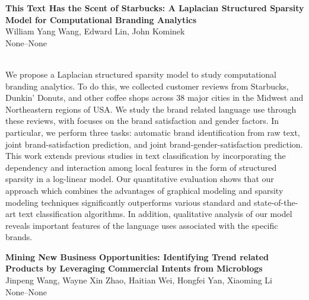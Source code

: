 \documentclass[twoside,makeidx]{book}
\renewcommand{\normalsize}{\fontsize{8}{9}\selectfont}
\renewcommand{\small}{\fontsize{7}{8}\selectfont}
\begin{document}
\par\vspace{2em}\noindent%
\begin{minipage}{\linewidth}%
\begin{center}
\textbf{\normalsize This Text Has the Scent of Starbucks: A Laplacian Structured Sparsity Model for Computational Branding Analytics}\\
\normalsize  William Yang Wang,  Edward Lin,  John Kominek\\
{\small None--None}\\
\end{center}
\end{minipage}\\[0.5em]
\nopagebreak%
\noindent%
{\small We propose a Laplacian structured sparsity model to study computational branding analytics. To do this, we collected customer reviews from Starbucks, Dunkin' Donuts, and other coffee shops across 38 major cities in the Midwest and Northeastern regions of USA. We study the brand related language use through these reviews, with focuses on the brand satisfaction and gender factors. In particular, we perform three tasks: automatic brand identification from raw text, joint brand-satisfaction prediction, and joint brand-gender-satisfaction prediction. This work extends previous studies in text classification by incorporating the dependency and interaction among local features in the form of structured sparsity in a log-linear model. Our quantitative evaluation shows that our approach which combines the advantages of graphical modeling and sparsity modeling techniques significantly outperforms various standard and state-of-the-art text classification algorithms. In addition, qualitative analysis of our model reveals important features of the language uses associated with the specific brands.}
\par\vspace{2em}\noindent%
\begin{minipage}{\linewidth}%
\begin{center}
\textbf{\normalsize Mining New Business Opportunities: Identifying Trend related Products by Leveraging Commercial Intents from Microblogs}\\
\normalsize  Jinpeng Wang,  Wayne Xin Zhao,  Haitian Wei,  Hongfei Yan,  Xiaoming Li\\
{\small None--None}\\
\end{center}
\end{minipage}\\[0.5em]
\end{document}
